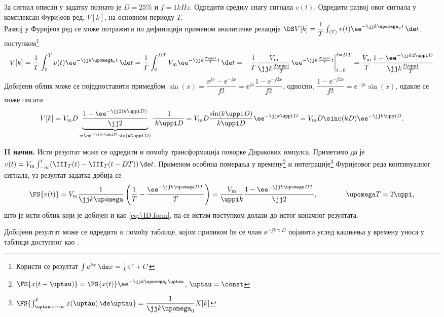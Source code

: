 \PID \label{z:rect_povorka}
За сигнал описан у задатку  познато је 
$D = 25\%$ и $f = 1\unit{kHz}$. Одредити средњу снагу сигнала $v(t)$.
Одредити развоj овог сигнала у комплексан Фуриjеов ред, $V[k]$, на основном периоду $T$.
\\[2mm]

\RESENJE  Развој у Фуријеов ред се може потражити по дефиницији применом 
аналитичке релације 
$\DS V[k] = \dfrac{1}{T} \int_{\langle T \rangle} v(t) \ee^{-\jj k \upomega_{\rm F} t} \, \de t$, 
поступком\footnote{Користи се резултат $\int e^{kx} \, \de x = \frac{1}{k} e^x + C$}
\begin{align}
    V[k] = \dfrac{1}{T} \int_{0}^T v(t) \ee^{-\jj k \upomega_{\rm 0} t} \, \de t 
         = \dfrac{1}{T} \int_{0}^{DT}  V_{\rm m} \ee^{-\jj k \frac{2\uppi}{T} t} \, \de t
         = - \dfrac{1}{T} \dfrac{V_{\rm m}}{\jj k \frac{2\uppi}{T}} 
         \ee^{-\jj k \frac{2\uppi}{T} t}\bigg|_{t = 0}^{t = DT}
         = \dfrac{V_{\rm m}}{T} \dfrac{
            1
            -
            \ee^{-\jj k 2\uppi D}
         }{\jj k \frac{2\uppi}{T}} 
\end{align}
Добијени облик може се поједноставити примедбом 
$\sin(x) = \dfrac{\ee^{\jj x} - \ee^{-\jj x}}{\jj 2} = \ee^{\jj x} \dfrac{1 - \ee^{-\jj 2x}}{\jj 2}$,
односно, 
$\dfrac{1 - \ee^{-\jj 2x}}{\jj 2} = \ee^{-\jj x} \sin(x) $,
одакле се може писати
\begin{align}
    V[k] = V_{\rm m}D 
     \underbrace{
     \dfrac{
        1
        -
        \ee^{-\jj 2 (k \uppi D) }
     }{\jj 2 }}_{ = \ee^{-\jj k \uppi D} \sin(k\uppi D) }
     \cdot 
     \dfrac{1}{k \uppi D} 
     = V_{\rm m} D \dfrac{\sin(k\uppi D)}{k\uppi D} \ee^{-\jj k \uppi D} 
     = V_{\rm m} D \sinc(k D) \ee^{-\jj k \uppi D}. \label{eq:\ID.form}
\end{align}

\textbf{II начин.} Исти резултат може  се одредити и помоћу трансформација поворке Диракових импулса. 
Приметимо да је $v(t) = V_{\rm m} \int_{-\infty}^t (\III_T(t) - \III_T(t - DT))\, \de t$. Применом особина 
померања у времену\footnote{
   $\FS{x(t-\uptau)} = \FS{x(t)} \ee^{-\jj k \upomega_{\rm 0} \uptau}$, $\uptau = \const$
}
и интеграције\footnote{
   $\FS{ \int_{\uptau = -\infty}^t x(\uptau) \, \de \uptau } = \dfrac{1}{\jj k \upomega_0} X[k]$ 
} Фуријеовог реда континуалног сигнала, уз резултат задатка  добија се 
\begin{equation}
   \FS{v(t)} = V_{\rm m} \dfrac{1}{\jj k \upomega }  \left( \dfrac{1}{T} - \dfrac{\ee^{-\jj k \upomega D T}}{T} \right)
             = \dfrac{V_{\rm m}}{\uppi k} \dfrac{1 - \ee^{-\jj k \upomega D T}}{\jj 2}, \qquad \qquad \upomega T = 2\uppi,
\end{equation}
што је исти облик који је добијен и као \eqref{eq:\ID.form}, па се истим поступком долази до истог коначног резултата.

Добијени резултат може се одредити и помоћу таблице, којом приликом ће се члан 
$\ee^{-\jj k \uppi D}$ појавити услед кашњења у времену уноса у таблици доступног као . 
